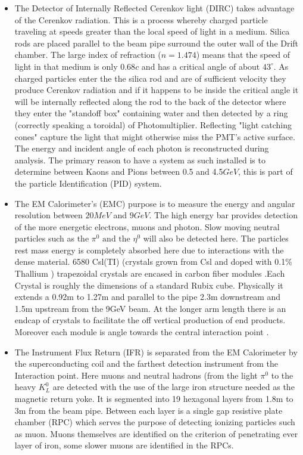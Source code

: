 \begin{itemize}
\item The Detector of Internally Reflected Cerenkov light (DIRC) takes advantage of the Cerenkov radiation. This is a process whereby charged particle traveling at speeds greater than the local speed of light in a medium. Silica rods are placed parallel to the beam pipe surround the outer wall of the Drift chamber. The large index of refraction ($n= 1.474$) means that the speed of light in that medium is only $0.68c$ and has a critical angle of about $43^{\circ}$. As charged particles enter the the silica rod and are of sufficient velocity they produce Cerenkov radiation and if it happens to be inside the critical angle it will be internally reflected along the rod to the back of the detector where they enter the "standoff box" containing water and then detected by a ring (correctly speaking a toroidal) of Photomultiplier. Reflecting "light catching cones" capture the light that might otherwise miss the PMT's active surface.  The energy and incident angle of each photon is reconstructed during analysis. The primary reason to have a system as such installed is to determine between Kaons and Pions between 0.5 and 4.5$GeV$, this is part of the particle Identification (PID) system. 


\item The EM Calorimeter's (EMC) purpose is to measure the energy and angular resolution between $20MeV$ and $9GeV$. The high energy bar provides detection of the more energetic electrons, muons and photon. Slow moving neutral particles such as the $\pi^0 \mbox{ and the } \eta^0$ will also be detected here. The particles rest mass energy is completely absorbed here due to interactions with the dense material. 6580 Csl(TI) (crystals grown from Csl and doped with 0.1$\%$ Thallium ) trapezoidal crystals are encased in carbon fiber modules .Each Crystal is roughly the dimensions of a standard Rubix cube. Physically it extends a 0.92m to 1.27m and parallel to the pipe 2.3m downstream and 1.5m upstream from the 9GeV beam. At the longer arm length there is an endcap of crystals to facilitate the off vertical production of end products. Moreover each module is angle towards the central interaction point \cite{B15}.

\item The Instrument Flux Return (IFR) is separated from the EM Calorimeter by the superconducting coil and the farthest detection instrument from the Interaction point. Here muons and neutral hadrons (from the light $\pi^0$ to the heavy $K^{0}_{L}$ are detected with the use of the large iron structure needed as the magnetic return yoke. It is segmented into 19 hexagonal layers from 1.8m to 3m from the beam pipe. Between each layer is a single gap resistive plate chamber (RPC) which serves the purpose of detecting ionizing particles such as muon. Muons themselves are identified on the criterion of penetrating ever layer of iron, some slower muons are identified in the RPCs. 
\end{itemize}
